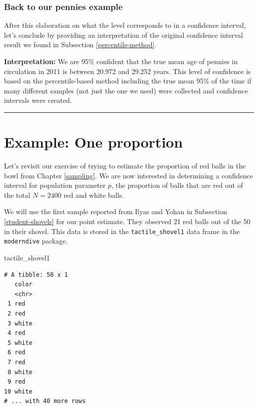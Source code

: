 \documentclass[12pt, krantz2,]{krantz}
\makeatletter
\newenvironment{Shaded}{\begin{snugshade}}{\end{snugshade}}
\newcommand{\NormalTok}[1]{#1}
\newenvironment{kframe}{%
\medskip{}
\setlength{\fboxsep}{.8em}
 \def\at@end@of@kframe{}%
 \ifinner\ifhmode%
  \def\at@end@of@kframe{\end{minipage}}%
  \begin{minipage}{\columnwidth}%
 \fi\fi%
 \def\FrameCommand##1{\hskip\@totalleftmargin \hskip-\fboxsep
 \colorbox{shadecolor}{##1}\hskip-\fboxsep
     \hskip-\linewidth \hskip-\@totalleftmargin \hskip\columnwidth}%
 \MakeFramed {\advance\hsize-\width
   \@totalleftmargin\z@ \linewidth\hsize
   \@setminipage}}%
 {\par\unskip\endMakeFramed%
 \at@end@of@kframe}
\renewenvironment{Shaded}{\begin{kframe}}{\end{kframe}}
\makeatother
\begin{document}
\hypertarget{back-to-our-pennies-example}{%
\subsubsection*{Back to our pennies example}\label{back-to-our-pennies-example}}


After this elaboration on what the level corresponds to in a confidence interval, let's conclude by providing an interpretation of the original confidence interval result we found in Subsection \ref{percentile-method}.

\textbf{Interpretation:} We are 95\% confident that the true mean age of pennies in circulation in 2011 is between 20.972 and 29.252 years. This level of confidence is based on the percentile-based method including the true mean 95\% of the time if many different samples (not just the one we used) were collected and confidence intervals were created.

\begin{center}\rule{0.5\linewidth}{\linethickness}\end{center}

\hypertarget{one-prop-ci}{%
\section{Example: One proportion}\label{one-prop-ci}}

Let's revisit our exercise of trying to estimate the proportion of red balls in the bowl from Chapter \ref{sampling}. We are now interested in determining a confidence interval for population parameter \(p\), the proportion of balls that are red out of the total \(N = 2400\) red and white balls.

We will use the first sample reported from Ilyas and Yohan in Subsection \ref{student-shovels} for our point estimate. They observed 21 red balls out of the 50 in their shovel. This data is stored in the \texttt{tactile\_shovel1} data frame in the \texttt{moderndive} package.

\begin{Shaded}
\begin{Highlighting}[]
\NormalTok{tactile_shovel1}
\end{Highlighting}
\end{Shaded}

\begin{verbatim}
# A tibble: 50 x 1
   color
   <chr>
 1 red  
 2 red  
 3 white
 4 red  
 5 white
 6 red  
 7 red  
 8 white
 9 red  
10 white
# ... with 40 more rows
\end{verbatim}
\end{document}
